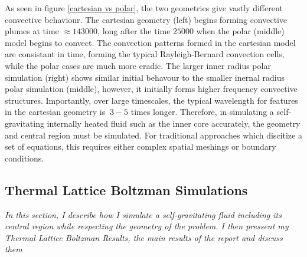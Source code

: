 \documentclass{article}
\begin{document}
As seen in figure \ref{cartesian vs polar}, the two geometries give vastly different convective behaviour. The cartesian geometry (left) begins forming 
convective plumes at time $\approx 143000$, long after the time $25000$ when the polar (middle) model begins to convect. The convection patterns formed 
in the cartesian model are consistant in time, forming the typical Rayleigh-Bernard convection cells, while the polar cases are much more eradic. The larger inner radius polar simulation (right) shows similar initial behavour to the smaller inernal radius polar simulation (middle), however, it initially forms higher frequency convective structures. Importantly, over large timescales, the typical wavelength for features in the cartesian geometry is $~3-5$ times longer. Therefore, in simulating a self-gravitating internally heated fluid such as the inner core accurately, the geometry and central region must be simulated. For traditional approaches which discitize a set of equations, this requires either complex spatial meshings or boundary conditions. 

\subsection*{Thermal Lattice Boltzman Simulations}
{\it{In this section, I describe how I simulate a self-gravitating fluid including its central region while respecting the geometry of the problem. I then pressent my Thermal Lattice Boltzman Results, the main results of the report and discuss them}}
\end{document}
